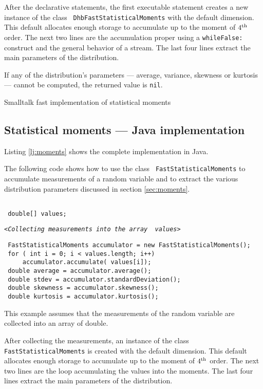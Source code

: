\documentclass[twoside]{book}
\begin{document}
After the declarative statements, the first executable statement
creates a new instance of the class {\tt
DhbFastStatisticalMoments} with the default dimension. This
default allocates enough storage to accumulate up to the moment of
$4^{\mathop{\rm th}}$ order. The next two lines are the accumulation proper using
a {\tt whileFalse:} construct and the general behavior of a
stream. The last four lines extract the main parameters of the
distribution.

If any of the distribution's parameters --- average, variance,
skewness or kurtosis --- cannot be computed, the returned value is
{\tt nil}.

\begin{listing} Smalltalk fast implementation of statistical moments \label{ls:fastmoments}

\end{listing}

\subsection{Statistical moments --- Java implementation}
\label{sec:jmoments}Listing \ref{lj:moments} shows the complete
implementation in Java.

The following code shows how to use the class {\tt
FastStatisticalMoments} to accumulate measurements of a random
variable and to extract the various distribution parameters
discussed in section \ref{sec:moments}.
\begin{codeExample}
\label{ex:jmoments}
\begin{verbatim}

 double[] values;
\end{verbatim}
\hfil{\tt<\sl Collecting measurements into the array \tt
values>}\hfil
\begin{verbatim}
 FastStatisticalMoments accumulator = new FastStatisticalMoments();
 for ( int i = 0; i < values.length; i++)
     accumulator.accumulate( values[i]);
 double average = accumulator.average();
 double stdev = accumulator.standardDeviation();
 double skewness = accumulator.skewness();
 double kurtosis = accumulator.kurtosis();
\end{verbatim}
\end{codeExample}
This example assumes that the measurements of the random variable
are collected into an array of double.

After collecting the measurements, an instance of the class {\tt
FastStatisticalMoments} is created with the default dimension.
This default allocates enough storage to accumulate up to the
moment of $4^{\mathop{\rm th}}$ order. The next two lines are the loop
accumulating the values into the moments. The last four lines
extract the main parameters of the distribution.
\end{document}
